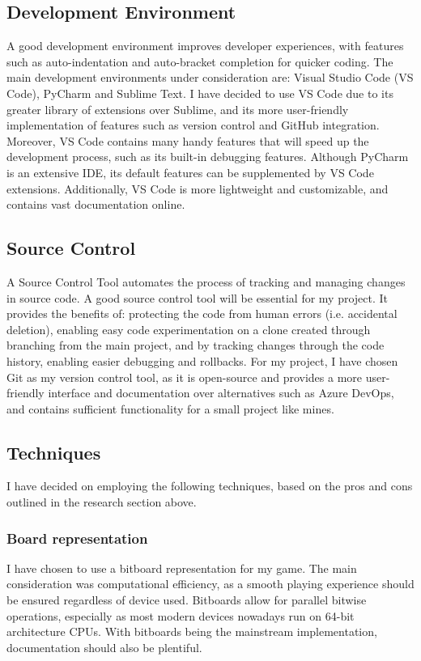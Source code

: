 \documentclass[../main/main.tex]{subfiles}
\begin{document}
\subsection{Development Environment}
A good development environment improves developer experiences, with features such as auto-indentation and auto-bracket completion for quicker coding. The main development environments under consideration are: Visual Studio Code (VS Code), PyCharm and Sublime Text. I have decided to use VS Code due to its greater library of extensions over Sublime, and its more user-friendly implementation of features such as version control and GitHub integration. Moreover, VS Code contains many handy features that will speed up the development process, such as its built-in debugging features. Although PyCharm is an extensive IDE, its default features can be supplemented by VS Code extensions. Additionally, VS Code is more lightweight and customizable, and contains vast documentation online.

\subsection{Source Control}
A Source Control Tool automates the process of tracking and managing changes in source code. A good source control tool will be essential for my project. It provides the benefits of: protecting the code from human errors (i.e. accidental deletion), enabling easy code experimentation on a clone created through branching from the main project, and by tracking changes through the code history, enabling easier debugging and rollbacks. For my project, I have chosen Git as my version control tool, as it is open-source and provides a more user-friendly interface and documentation over alternatives such as Azure DevOps, and contains sufficient functionality for a small project like mines.

\subsection{Techniques}
I have decided on employing the following techniques, based on the pros and cons outlined in the research section above.

\subsubsection*{Board representation}
I have chosen to use a bitboard representation for my game. The main consideration was computational efficiency, as a smooth playing experience should be ensured regardless of device used. Bitboards allow for parallel bitwise operations, especially as most modern devices nowadays run on 64-bit architecture CPUs. With bitboards being the mainstream implementation, documentation should also be plentiful.
\end{document}

